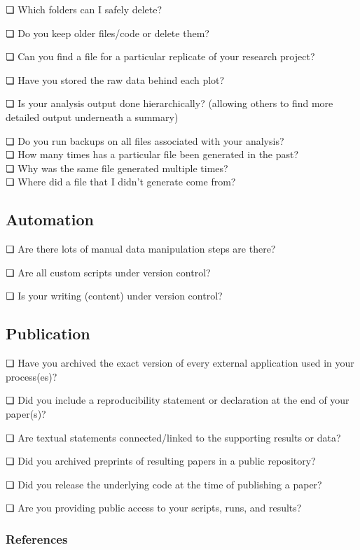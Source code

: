 \documentclass[
]{book}
\theoremstyle{definition}
\theoremstyle{definition}
\theoremstyle{definition}
\theoremstyle{definition}
\theoremstyle{remark}
\begin{document}
❏ Which folders can I safely delete?

❏ Do you keep older files/code or delete them?

❏ Can you find a file for a particular replicate of your research project?

❏ Have you stored the raw data behind each plot?

❏ Is your analysis output done hierarchically? (allowing others to find more detailed output underneath a summary)

❏ Do you run backups on all files associated with your analysis?\\
❏ How many times has a particular file been generated in the past?\\
❏ Why was the same file generated multiple times?\\
❏ Where did a file that I didn't generate come from?

\hypertarget{automation}{%
\subsection{Automation}\label{automation}}

❏ Are there lots of manual data manipulation steps are there?

❏ Are all custom scripts under version control?

❏ Is your writing (content) under version control?

\hypertarget{publication}{%
\subsection{Publication}\label{publication}}

❏ Have you archived the exact version of every external application used in your process(es)?

❏ Did you include a reproducibility statement or declaration at the end of your paper(s)?

❏ Are textual statements connected/linked to the supporting results or data?

❏ Did you archived preprints of resulting papers in a public repository?

❏ Did you release the underlying code at the time of publishing a paper?

❏ Are you providing public access to your scripts, runs, and results?

\hypertarget{references}{%
\subsubsection{References}\label{references}}
\end{document}
